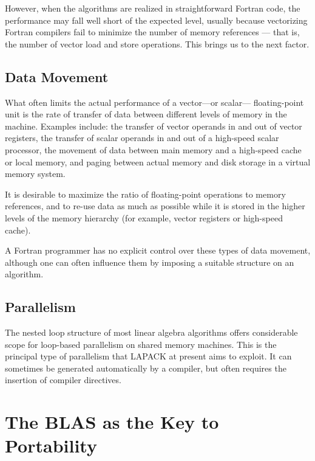 However, when the algorithms are realized in straightforward Fortran
code,
the performance may fall well short of the expected level, usually because
vectorizing Fortran compilers fail to minimize the number of memory
references
--- that is, the number of vector load and store operations. This brings us
to
the next factor.

\subsection{Data Movement}\label{subsecdata}

What often limits the actual performance of a vector---or scalar---
floating-point unit is the rate of transfer of data between different levels
of memory in the machine. Examples include: the transfer of vector operands
in and out of vector registers, the transfer of
scalar operands in and out of a
high-speed scalar processor, the movement of data between main memory and a
high-speed cache or local memory, and
paging between
actual memory and disk storage in a virtual memory system.

It is desirable to maximize the ratio of floating-point operations to memory
references, and to re-use data as much as possible while it is stored in the
higher levels of the memory hierarchy (for example, vector registers or
high-speed cache).

A Fortran programmer has no explicit control over these types of data
movement,
although one can often influence them by imposing a suitable structure on an
algorithm.

\subsection{Parallelism}\label{subsecparallel}

The nested loop structure of most linear algebra algorithms offers
considerable scope for loop-based parallelism on shared memory
machines. This is the principal type of parallelism that LAPACK at present
aims to exploit.
It can sometimes be generated automatically
by a compiler, but often requires the insertion of compiler
directives.

\section{The BLAS as the Key to Portability}\label{secblasport}

